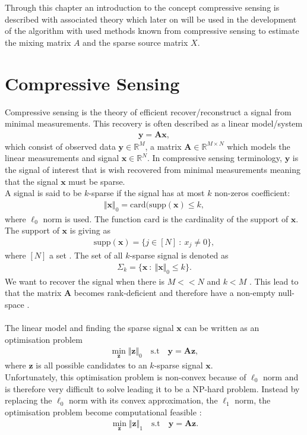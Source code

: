 Through this chapter an introduction to the concept compressive sensing is described with associated theory which later on will be used in the development of the algorithm with used methods known from compressive sensing to estimate the mixing matrix $A$ and the sparse source matrix $X$.

\section{Compressive Sensing}
Compressive sensing is the theory of efficient recover/reconstruct a signal from minimal measurements. This recovery is often described as a linear model/system 
\begin{align*}
\mathbf{y} = \mathbf{Ax},
\end{align*}
which consist of observed data $\mathbf{y} \in \mathbb{R}^M$, a matrix $\mathbf{A} \in \mathbb{R}^{M \times N}$ which models the linear measurements and signal $\mathbf{x} \in \mathbb{R}^N$. In compressive sensing terminology, $\mathbf{y}$ is the signal of interest that is wish recovered from minimal measurements meaning that the signal $\mathbf{x}$ must be sparse.
\\
A signal is said to be $k$-sparse if the signal has at most $k$ non-zeros coefficient: 
\begin{align*}
\Vert \mathbf{x} \Vert_0 = \text{card}(\text{supp}(\mathbf{x}) \leq k,
\end{align*}
where $\ell_0$ norm is used. The function $\text{card}$ is the cardinality of the support of $\mathbf{x}$. The support of $\mathbf{x}$ is giving as
\begin{align*}
\text{supp}(\mathbf{x}) = \{ j \in [N] \ : \ x_j \neq 0 \},
\end{align*} 
where $[N]$ a set \cite[p. 41]{FR}. The set of all $k$-sparse signal is denoted as
\begin{align*}
\Sigma_k = \{ \mathbf{x} \ : \ \Vert \mathbf{x} \Vert_0 \leq k \}.
\end{align*}
We want to recover the signal when there is $M << N$ and $k < M$ \cite[p. 8]{CS}. This lead to that the matrix $\mathbf{A}$ becomes rank-deficient and therefore have a non-empty null-space \cite[p. XX]{CS}.
\\ \\
The linear model and finding the sparse signal $\mathbf{x}$ can be written as an optimisation problem
\begin{align*}
\min_{\mathbf{z}} \Vert \mathbf{z} \Vert_0 \quad \text{s.t} \quad \mathbf{y} = \mathbf{Az},
\end{align*}
where $\mathbf{z}$ is all possible candidates to an $k$-sparse signal $\mathbf{x}$.
\\
Unfortunately, this optimisation problem is non-convex because of $\ell_0$ norm and is therefore very difficult to solve leading it to be a NP-hard problem. Instead by replacing the $\ell_0$ norm with its convex approximation, the $\ell_1$ norm, the optimisation problem become computational feasible \cite[p. 27]{CS}:
\begin{align*}
\min_{\mathbf{z}} \Vert \mathbf{z} \Vert_1 \quad \text{s.t} \quad \mathbf{y} = \mathbf{Az}.
\end{align*} 

